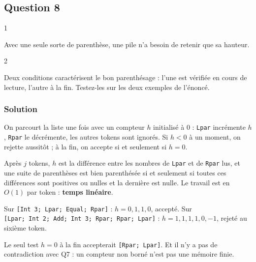\documentclass[11pt,a4paper]{article}
\begin{document}
\hypertarget{question-8}{%
\subsection{Question 8}\label{question-8}}

\begin{indication}{1}

Avec une seule sorte de parenthèse, une pile n'a besoin de retenir que sa hauteur.

\end{indication}

\begin{indication}{2}

Deux conditions caractérisent le bon parenthésage : l'une est vérifiée en cours de lecture, l'autre à la fin. Testez-les sur les deux exemples de l'énoncé.

\end{indication}

\hypertarget{solution-7}{%
\subsubsection{Solution}\label{solution-7}}

On parcourt la liste une fois avec un compteur \(h\) initialisé à \(0\) : \texttt{Lpar} incrémente \(h\), \texttt{Rpar} le décrémente, les autres tokens sont ignorés. Si \(h < 0\) à un moment, on rejette aussitôt ; à la fin, on accepte si et seulement si \(h = 0\).

Après \(j\) tokens, \(h\) est la différence entre les nombres de \texttt{Lpar} et de \texttt{Rpar} lus, et une suite de parenthèses est bien parenthésée si et seulement si toutes ces différences sont positives ou nulles et la dernière est nulle. Le travail est en \(O(1)\) par token : \textbf{temps linéaire}.

Sur \texttt{{[}Int\ 3;\allowbreak{}\ Lpar;\allowbreak{}\ Equal;\allowbreak{}\ Rpar{]}\allowbreak{}} : \(h = 0, 1, 1, 0\), accepté. Sur \texttt{{[}Lpar;\allowbreak{}\ Int\ 2;\allowbreak{}\ Add;\allowbreak{}\ Int\ 3;\allowbreak{}\ Rpar;\allowbreak{}\ Rpar;\allowbreak{}\ Lpar{]}\allowbreak{}} : \(h = 1, 1, 1, 1, 0, -1\), rejeté au sixième token.

\begin{piege}

Le seul test \(h = 0\) à la fin accepterait \texttt{{[}Rpar;\ Lpar{]}}. Et il n'y a pas de contradiction avec Q7 : un compteur non borné n'est pas une mémoire finie.

\end{piege}
\end{document}
